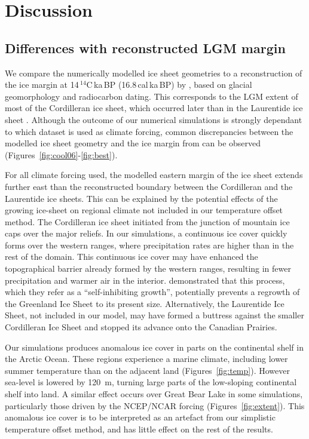 
\section{Discussion}
\label{sec:discussion}

\subsection{Differences with reconstructed LGM margin}

We compare the numerically modelled ice sheet geometries to a reconstruction of the ice margin at 14\,$^{14}$C\,ka\,BP (16.8\,cal\,ka\,BP) by \citet{dyke-2004}, based on glacial geomorphology and radiocarbon dating. This corresponds to the LGM extent of most of the Cordilleran ice sheet, which occurred later than in the Laurentide ice sheet \citep{dyke-2004}.
Although the outcome of our numerical simulations is strongly dependant to which dataset is used as climate forcing, common discrepancies between the modelled ice sheet geometry and the ice margin from \citet{dyke-2004} can be observed (Figures~\ref{fig:cool06}-\ref{fig:best}).

For all climate forcing used, the modelled eastern margin of the ice sheet extends further east than the reconstructed boundary between the Cordilleran and the Laurentide ice sheets. This can be explained by the potential effects of the growing ice-sheet on regional climate not included in our temperature offset method. The Cordilleran ice sheet initiated from the junction of mountain ice caps over the major reliefs. In our simulations, a continuous ice cover quickly forms over the western ranges, where precipitation rates are higher than in the rest of the domain. This continuous ice cover may have enhanced the topographical barrier already formed by the western ranges, resulting in fewer precipitation and warmer air in the interior. \citet{langen-etal-2012} demonstrated that this process, which they refer as a ``self-inhibiting growth'', potentially prevents a regrowth of the Greenland Ice Sheet to its present size. Alternatively, the Laurentide Ice Sheet, not included in our model, may have formed a buttress against the smaller Cordilleran Ice Sheet and stopped its advance onto the Canadian Prairies.

Our simulations produces anomalous ice cover in parts on the continental shelf in the Arctic Ocean. These regions experience a marine climate, including lower summer temperature than on the adjacent land (Figures~\ref{fig:temp}). However sea-level is lowered by 120~m, turning large parts of the low-sloping continental shelf into land. A similar effect occurs over Great Bear Lake in some simulations, particularly those driven by the NCEP/NCAR forcing (Figures~\ref{fig:extent}). This anomalous ice cover is to be interpreted as an artefact from our simplistic temperature offset method, and has little effect on the rest of the results.

